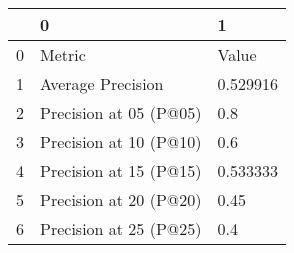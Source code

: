 \begin{tabular}{lll}
\toprule
{} &                       0 &         1 \\
\midrule
0 &                  Metric &     Value \\
1 &       Average Precision &  0.529916 \\
2 &  Precision at 05 (P@05) &       0.8 \\
3 &  Precision at 10 (P@10) &       0.6 \\
4 &  Precision at 15 (P@15) &  0.533333 \\
5 &  Precision at 20 (P@20) &      0.45 \\
6 &  Precision at 25 (P@25) &       0.4 \\
\bottomrule
\end{tabular}
